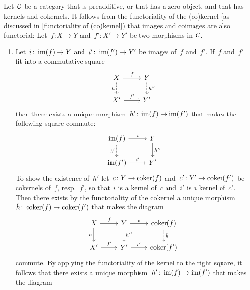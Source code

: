 \begin{remark*}
  \label{functoriality of (co)image}
  Let~$\mathcal{C}$ be a category that is preadditive, or that has a zero object, and that has kernels and cokernels.
  It follows from the functoriality of the (co)kernel (as discussed in \cref{functoriality of (co)kernel}) that images and coimages are also functorial:
  Let~$f \colon X \to Y$ and~$f' \colon X' \to Y'$ be two morphisms in~$\mathcal{C}$.
  \begin{enumerate}
    \item
      Let~$i \colon \operatorname{im}(f) \to Y$ and~$i' \colon \operatorname{im}(f') \to Y'$ be images of~$f$ and~$f'$.
      If~$f$ and~$f'$ fit into a commutative square
      \[
        \begin{tikzcd}
            X
            \arrow{r}[above]{f}
            \arrow[dashed]{d}[left]{h}
          & Y
            \arrow[dashed]{d}[right]{h''}
          \\
            X'
            \arrow{r}[above]{f'}
          & Y'
        \end{tikzcd}
      \]
      then there exists a unique morphism~$h' \colon \operatorname{im}(f) \to \operatorname{im}(f')$ that makes the following square commute:
      \[
        \begin{tikzcd}
            \im(f)
            \arrow{r}[above]{i}
            \arrow[dashed]{d}[left]{h'}
          & Y
            \arrow{d}[right]{h''}
          \\
            \im(f')
            \arrow{r}[above]{i'}
          & Y'
        \end{tikzcd}
      \]
      To show the existence of~$h'$ let~$c \colon Y \to \operatorname{coker}(f)$ and~$c' \colon Y' \to \operatorname{coker}(f')$ be cokernels of~$f$, resp.~$f'$, so that~$i$ is a kernel of~$c$ and~$i'$ is a kernel of~$c'$.
      Then there exists by the functoriality of the cokernel a unique morphism~$\bar{h} \colon \operatorname{coker}(f) \to \operatorname{coker}(f')$ that makes the diagram
      \[
        \begin{tikzcd}
            X
            \arrow{r}[above]{f}
            \arrow{d}[left]{h}
          & Y
            \arrow{r}[above]{c}
            \arrow{d}[right]{h''}
          & \coker(f)
            \arrow[dashed]{d}[right]{\bar{h}}
          \\
            X'
            \arrow{r}[above]{f'}
          & Y'
            \arrow{r}[above]{c'}
          & \coker(f')
        \end{tikzcd}
      \]
      commute.
      By applying the functoriality of the kernel to the right square, it follows that there exists a unique morphism~$h' \colon \operatorname{im}(f) \to \operatorname{im}(f')$ that makes the diagram

\end{enumerate}
\end{remark*}
